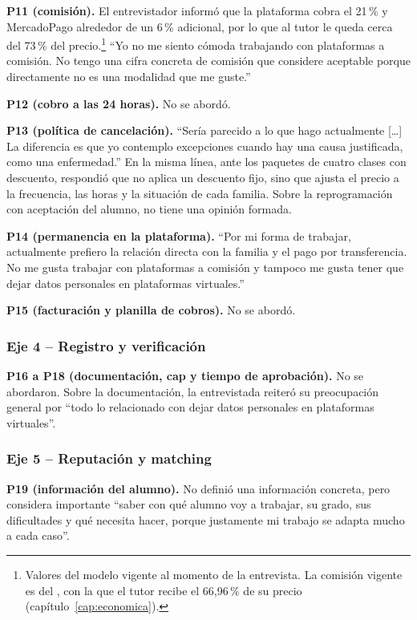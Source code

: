 \textbf{P11 (comisión).} El entrevistador informó que la plataforma cobra
el 21\,\% y MercadoPago alrededor de un 6\,\% adicional, por lo que al
tutor le queda cerca del 73\,\% del precio.\footnote{Valores del modelo
vigente al momento de la entrevista. La comisión vigente es del
\comision{}, con la que el tutor recibe el 66,96\,\% de su precio
(capítulo~\ref{cap:economica}).} ``Yo no me siento cómoda
trabajando con plataformas a comisión. No tengo una cifra concreta de
comisión que considere aceptable porque directamente no es una modalidad
que me guste.''

\textbf{P12 (cobro a las 24 horas).} No se abordó.

\textbf{P13 (política de cancelación).} ``Sería parecido a lo que hago
actualmente [\ldots] La diferencia es que yo contemplo excepciones cuando
hay una causa justificada, como una enfermedad.'' En la misma línea,
ante los paquetes de cuatro clases con descuento, respondió que no
aplica un descuento fijo, sino que ajusta el precio a la frecuencia, las
horas y la situación de cada familia. Sobre la reprogramación con
aceptación del alumno, no tiene una opinión formada.

\textbf{P14 (permanencia en la plataforma).} ``Por mi forma de trabajar,
actualmente prefiero la relación directa con la familia y el pago por
transferencia. No me gusta trabajar con plataformas a comisión y tampoco
me gusta tener que dejar datos personales en plataformas virtuales.''

\textbf{P15 (facturación y planilla de cobros).} No se abordó.

\subsubsection*{Eje 4 -- Registro y verificación}

\textbf{P16 a P18 (documentación, \gls{cap} y tiempo de aprobación).} No
se abordaron. Sobre la documentación, la entrevistada reiteró su
preocupación general por ``todo lo relacionado con dejar datos personales
en plataformas virtuales''.

\subsubsection*{Eje 5 -- Reputación y matching}

\textbf{P19 (información del alumno).} No definió una información
concreta, pero considera importante ``saber con qué alumno voy a
trabajar, su grado, sus dificultades y qué necesita hacer, porque
justamente mi trabajo se adapta mucho a cada caso''.

